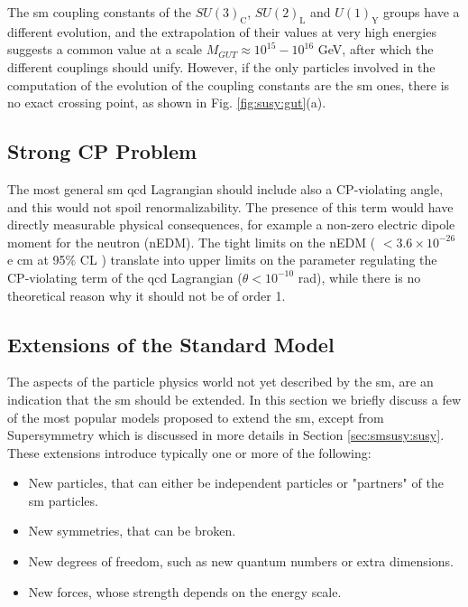 The \gls{sm} coupling constants of the $SU(3)_\mathrm{C}$, $SU(2)_\mathrm{L}$ and $U(1)_\mathrm{Y}$ groups have a different evolution, and the extrapolation of their values at very high energies suggests a common value at a scale $M_{GUT} \approx 10^{15}-10^{16}$ GeV, after which the different couplings should unify. However, if the only particles involved in the computation of the evolution of the coupling constants are the \gls{sm} ones, there is no exact crossing point, as shown in Fig. \ref{fig:susy:gut}(a).

\subsection*{Strong CP Problem}

The most general \gls{sm} \gls{qcd} Lagrangian should include also a CP-violating angle, and this would not spoil renormalizability. The presence of this term would have directly measurable physical consequences, for example a non-zero electric dipole moment for the neutron (nEDM). The tight  limits on the nEDM ( $< 3.6 \times 10^{-26}$ e cm at 95\% CL \cite{PhysRevD.92.092003}) translate into upper limits on the parameter regulating the CP-violating term of the \gls{qcd} Lagrangian ($\theta < 10^{-10}$ rad), while there is no theoretical reason why it should not be of order 1. 


\subsection{Extensions of the Standard Model}
\label{sec:sm:extensions}

The aspects of the particle physics world not yet described by the \gls{sm}, are an indication that the \gls{sm} should be extended.
In this section we briefly discuss a few of the most popular models proposed to extend the \gls{sm}, except from Supersymmetry which is discussed in more details in Section \ref{sec:smsusy:susy}. These extensions introduce typically one or more of the following:

\begin{itemize}
\item New particles, that can either be independent particles or "partners" of the \gls{sm} particles.
\item New symmetries, that can be broken. 
\item New degrees of freedom, such as new quantum numbers or extra dimensions.
\item New forces, whose strength depends on the energy scale.
\end{itemize}

